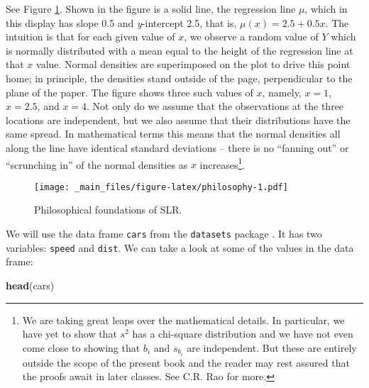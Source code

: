 \documentclass[]{book}
\newenvironment{Shaded}{\begin{snugshade}}{\end{snugshade}}
\newcommand{\KeywordTok}[1]{\textcolor[rgb]{0.13,0.29,0.53}{\textbf{{#1}}}}
\newcommand{\NormalTok}[1]{{#1}}
\let\rmarkdownfootnote\footnote%
\def\footnote{\protect\rmarkdownfootnote}
\numberwithin{equation}{chapter}
\numberwithin{figure}{chapter}
\theoremstyle{plain}
\theoremstyle{definition}
\theoremstyle{remark}
\theoremstyle{definition}
\theoremstyle{definition}
\theoremstyle{remark}
\let\BeginKnitrBlock\begin \let\EndKnitrBlock\end
\begin{document}
See Figure \ref{fig:philosophy}. Shown in the figure is a solid line,
the regression line  \(\mu\), which in this
display has slope 0.5 and \emph{y}-intercept 2.5, that is,
\(\mu(x)=2.5 + 0.5x\). The intuition is that for each given value of
\(x\), we observe a random value of \(Y\) which is normally distributed
with a mean equal to the height of the regression line at that \(x\)
value. Normal densities are superimposed on the plot to drive this point
home; in principle, the densities stand outside of the page,
perpendicular to the plane of the paper. The figure shows three such
values of \(x\), namely, \(x = 1\), \(x = 2.5\), and \(x = 4\). Not only
do we assume that the observations at the three locations are
independent, but we also assume that their distributions have the same
spread. In mathematical terms this means that the normal densities all
along the line have identical standard deviations -- there is no
``fanning out'' or ``scrunching in'' of the normal densities as \(x\)
increases\footnote{We are taking great leaps over the mathematical
  details. In particular, we have yet to show that \(s^{2}\) has a
  chi-square distribution and we have not even come close to showing
  that \(b_{i}\) and \(s_{b_{i}}\) are independent. But these are
  entirely outside the scope of the present book and the reader may rest
  assured that the proofs await in later classes. See C.R. Rao for more.}.

\begin{figure}[htbp]
\centering
\texttt{[image: \_main\_files/figure-latex/philosophy-1.pdf]}
\caption{\label{fig:philosophy}\small Philosophical foundations of SLR.}
\end{figure}



\bigskip

\BeginKnitrBlock{example}[Speed and stopping distance of cars]
\protect\hypertarget{ex:unnamed-chunk-200}{}{\label{ex:unnamed-chunk-200}
\iffalse (Speed and stopping distance of cars) \fi }We will use the data
frame \texttt{cars}  from the \texttt{datasets} package
\autocite{datasets}. It has two variables: \texttt{speed} and
\texttt{dist}. We can take a look at some of the values in the data
frame:
\EndKnitrBlock{example}

\begin{Shaded}
\begin{Highlighting}[]
\KeywordTok{head}\NormalTok{(cars)}
\end{Highlighting}
\end{Shaded}
\end{document}
